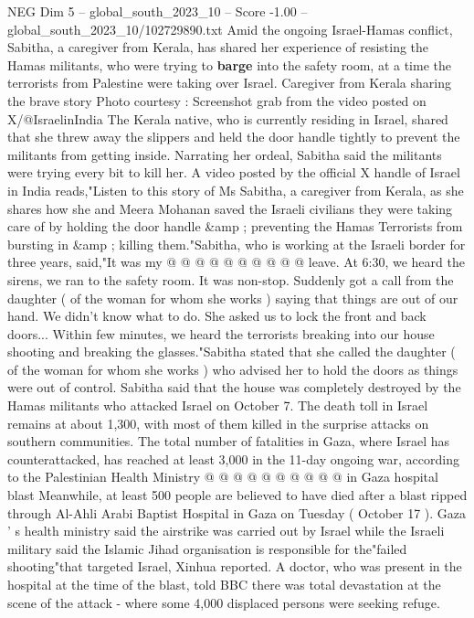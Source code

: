 \begin{textsample}{NEG Dim 5 – global\_south\_2023\_10 – Score -1.00 – global\_south\_2023\_10/102729890.txt}  \label{ex:f5_neg_067}
Amid the ongoing Israel-Hamas conflict, Sabitha, a caregiver from Kerala, has shared her experience of resisting the Hamas militants, who were trying to \textbf{barge} into the safety room, at a time the terrorists from Palestine were taking over Israel.
Caregiver from Kerala sharing the brave story Photo courtesy : Screenshot grab from the video posted on X/@IsraelinIndia The Kerala native, who is currently residing in Israel, shared that she threw away the slippers and held the door handle tightly to prevent the militants from getting inside.
Narrating her ordeal, Sabitha said the militants were trying every bit to kill her.
A video posted by the official X handle of Israel in India reads,"Listen to this story of Ms Sabitha, a caregiver from Kerala, as she shares how she and Meera Mohanan saved the Israeli civilians they were taking care of by holding the door handle \&amp ; preventing the Hamas Terrorists from bursting in \&amp ; killing them."Sabitha, who is working at the Israeli border for three years, said,"It was my @ @ @ @ @ @ @ @ @ @ leave.
At 6:30, we heard the sirens, we ran to the safety room.
It was non-stop.
Suddenly got a call from the daughter ( of the woman for whom she works ) saying that things are out of our hand.
We didn't know what to do.
She asked us to lock the front and back doors...
Within few minutes, we heard the terrorists breaking into our house shooting and breaking the glasses."Sabitha stated that she called the daughter ( of the woman for whom she works ) who advised her to hold the doors as things were out of control.
Sabitha said that the house was completely destroyed by the Hamas militants who attacked Israel on October 7.
The death toll in Israel remains at about 1,300, with most of them killed in the surprise attacks on southern communities.
The total number of fatalities in Gaza, where Israel has counterattacked, has reached at least 3,000 in the 11-day ongoing war, according to the Palestinian Health Ministry @ @ @ @ @ @ @ @ @ @ in Gaza hospital blast Meanwhile, at least 500 people are believed to have died after a blast ripped through Al-Ahli Arabi Baptist Hospital in Gaza on Tuesday ( October 17 ).
Gaza ' s health ministry said the airstrike was carried out by Israel while the Israeli military said the Islamic Jihad organisation is responsible for the"failed shooting"that targeted Israel, Xinhua reported.
A doctor, who was present in the hospital at the time of the blast, told BBC there was total devastation at the scene of the attack - where some 4,000 displaced persons were seeking refuge.

\end{textsample}
